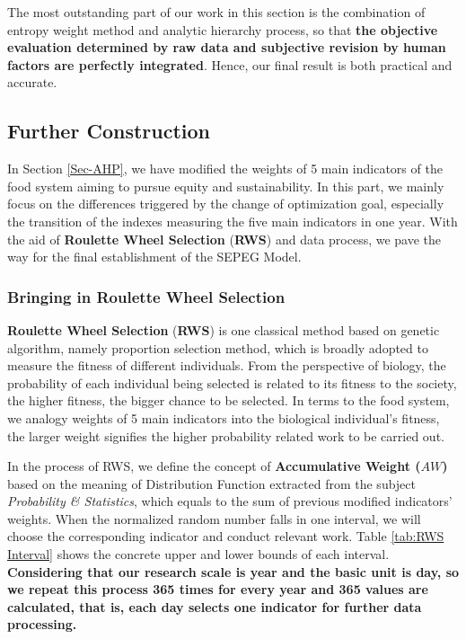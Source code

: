 \documentclass{mcmthesis}
\begin{document}
The most outstanding part of our work in this section is the combination of entropy weight method and analytic hierarchy process, so that \textbf{the objective evaluation determined by raw data and subjective revision by human factors are perfectly integrated}. Hence, our final result is both practical and accurate.

\subsection{Further Construction}
\label{Sec-Changes in Optimiaztion}
In Section \ref{Sec-AHP}, we have modified the weights of 5 main indicators of the food system aiming to pursue equity and sustainability. In this part, we mainly focus on the differences triggered by the change of optimization goal, especially the transition of the indexes measuring the five main indicators in one year. With the aid of \textbf{Roulette Wheel Selection} (\textbf{RWS}) and data process, we pave the way for the final establishment of the SEPEG Model.

\subsubsection{Bringing in Roulette Wheel Selection}
\label{Sec-RWS}

\textbf{Roulette Wheel Selection} (\textbf{RWS}) is one classical method based on genetic algorithm, namely proportion selection method, which is broadly adopted to measure the fitness of different individuals. From the perspective of biology, the probability of each individual being selected is related to its fitness to the society, the higher fitness, the bigger chance to be selected. In terms to the food system, we analogy weights of 5 main indicators into the biological individual's fitness, the larger weight signifies the higher probability related work to be carried out. 

In the process of RWS, we define the concept of \textbf{Accumulative Weight ($AW$)} based on the meaning of Distribution Function extracted from the subject \emph{Probability \& Statistics}, which equals to the sum of previous modified indicators' weights. When the normalized random number falls in one interval, we will choose the corresponding indicator and conduct relevant work. Table \ref{tab:RWS Interval} shows the concrete upper and lower bounds of each interval.\textbf{ Considering that our research scale is year and the basic unit is day, so we repeat this process 365 times for every year and 365 values are calculated, that is, each day selects one indicator for further data processing.}
\end{document}
